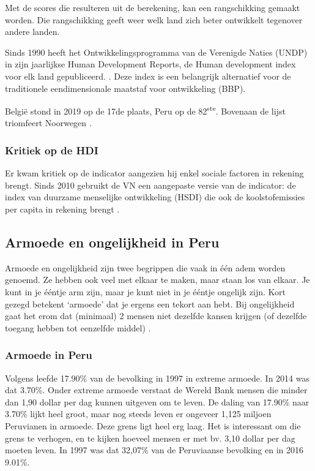 Met de scores die resulteren uit de berekening, kan een rangschikking gemaakt worden. Die rangschikking geeft weer welk land zich beter ontwikkelt tegenover andere landen. 

Sinds 1990 heeft het Ontwikkelingsprogramma van de Verenigde Naties (UNDP) in zijn jaarlijkse Human Development Reports, de Human development index voor elk land gepubliceerd. \autocite{AmbujD.Sagar1997}. Deze index is een belangrijk alternatief voor de traditionele eendimensionale maatstaf voor ontwikkeling (BBP). 

België stond in 2019 op de 17de plaats, Peru op de 82\textsuperscript{ste}. Bovenaan de lijst triomfeert Noorwegen \autocite{UNDP2019a}.

\subsubsection{Kritiek op de HDI}
Er kwam kritiek op de indicator aangezien hij enkel sociale factoren in rekening brengt. Sinds 2010 gebruikt de VN een aangepaste versie van de indicator: de index van duurzame menselijke ontwikkeling (HSDI) die ook de koolstofemissies per capita in rekening brengt \autocite{Economie2018}.

\subsection{Armoede en ongelijkheid in Peru}
Armoede en ongelijkheid zijn twee begrippen die vaak in één adem worden genoemd. Ze hebben ook veel met elkaar te maken, maar staan los van elkaar. Je kunt in je ééntje arm zijn, maar je kunt niet in je ééntje ongelijk zijn. Kort gezegd betekent ‘armoede’ dat je ergens een tekort aan hebt. Bij ongelijkheid gaat het erom dat (minimaal) 2 mensen niet dezelfde kansen krijgen (of dezelfde toegang hebben tot eenzelfde middel) \autocite{Novib2020}.

\subsubsection{Armoede in Peru}
Volgens \autocite{OurWorldInData2016} leefde 17.90\% van de bevolking in 1997 in extreme armoede. In 2014 was dat 3.70\%. Onder extreme armoede verstaat de Wereld Bank mensen die minder dan 1,90 dollar per dag kunnen uitgeven om te leven. De daling van 17.90\% naar 3.70\% lijkt heel groot, maar nog steeds leven er ongeveer 1,125 miljoen Peruvianen in armoede. Deze grens ligt heel erg laag. Het is interessant om die grens te verhogen, en te kijken hoeveel mensen er met bv. 3,10 dollar per dag moeten leven. In 1997 was dat 32,07\% van de Peruviaanse bevolking en in 2016  9.01\%.

